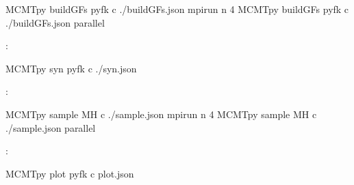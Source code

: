 \documentclass[a4paper,10pt,english,openany]{sphinxmanual}
\begin{document}
\begin{sphinxVerbatim}[commandchars=\\\{\}]
\PYGZdl{} MCMTpy build\PYGZus{}GFs pyfk  \PYGZhy{}c ./build\PYGZus{}GFs.json
\PYGZdl{} mpirun \PYGZhy{}n 4 MCMTpy build\PYGZus{}GFs pyfk  \PYGZhy{}c ./build\PYGZus{}GFs.json        \PYGZsh{} parallel
\end{sphinxVerbatim}

:

\begin{sphinxVerbatim}[commandchars=\\\{\}]
\PYGZdl{} MCMTpy  syn pyfk  \PYGZhy{}c ./syn.json
\end{sphinxVerbatim}

:

\begin{sphinxVerbatim}[commandchars=\\\{\}]
\PYGZdl{} MCMTpy  sample MH  \PYGZhy{}c ./sample.json
\PYGZdl{} mpirun \PYGZhy{}n 4  MCMTpy  sample MH  \PYGZhy{}c ./sample.json        \PYGZsh{} parallel
\end{sphinxVerbatim}

:

\begin{sphinxVerbatim}[commandchars=\\\{\}]
\PYGZdl{} MCMTpy plot pyfk \PYGZhy{}c plot.json
\end{sphinxVerbatim}





\end{document}
